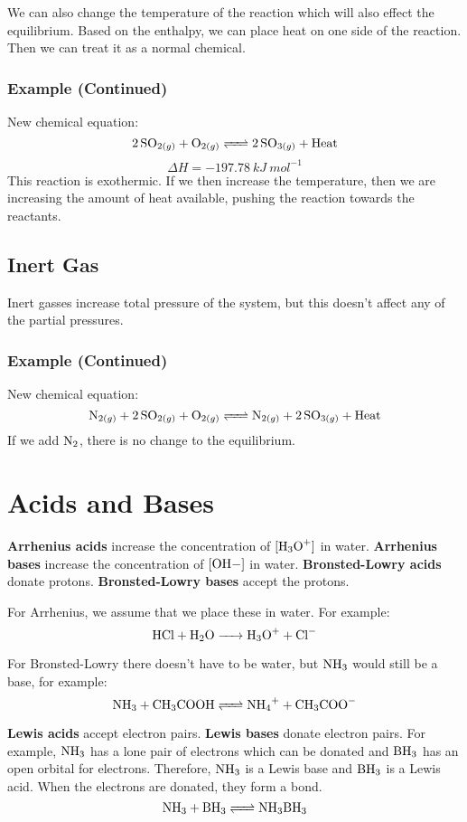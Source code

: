 \documentclass{article}
\begin{document}
We can also change the temperature of the reaction which will also effect the
equilibrium. Based on the enthalpy, we can place heat on one side of the
reaction. Then we can treat it as a normal chemical.

\subsubsection*{Example (Continued)}
New chemical equation:
$$\ce{2SO_{2(g)} + O_{2(g)} <=> 2SO_{3(g)} + Heat}$$
$$\Delta H=-197.78\ \si{kJ\ mol^{-1}}$$
This reaction is exothermic. If we then increase the temperature, then we are
increasing the amount of heat available, pushing the reaction towards the
reactants.

\subsection{Inert Gas}
Inert gasses increase total pressure of the system, but this doesn't affect any
of the partial pressures.

\subsubsection*{Example (Continued)}
New chemical equation:
$$\ce{N_{2(g)} + 2SO_{2(g)} + O_{2(g)} <=> N_{2(g)} + 2SO_{3(g)} + Heat}$$
If we add $\ce{N_2}$, there is no change to the equilibrium.

\section{Acids and Bases}

\textbf{Arrhenius acids} increase the concentration of $\ce{[H_3O+]}$ in water.
\textbf{Arrhenius bases} increase the concentration of $\ce{[OH-]}$ in water.
\textbf{Bronsted-Lowry acids} donate protons. \textbf{Bronsted-Lowry bases}
accept the protons.

For Arrhenius, we assume that we place these in water. For example:
$$\ce{HCl + H_2O -> H_3O+ + Cl-}$$

For Bronsted-Lowry there doesn't have to be water, but $\ce{NH_3}$ would still
be a base, for example:
$$\ce{NH_3 + CH_3COOH <=> NH_4+ + CH_3COO-}$$

\textbf{Lewis acids} accept electron pairs. \textbf{Lewis bases} donate electron
pairs. For example, $\ce{NH_3}$ has a lone pair of electrons which can be
donated and $\ce{BH_3}$ has an open orbital for electrons. Therefore,
$\ce{NH_3}$ is a Lewis base and $\ce{BH_3}$ is a Lewis acid. When the electrons
are donated, they form a bond.
$$\ce{NH_3 + BH_3 <=> NH_3BH_3}$$
\end{document}
